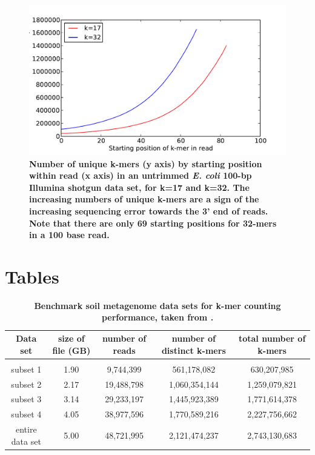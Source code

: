 \documentclass[10pt]{article}
\begin{document}
\begin{figure}[!ht]
\centerline{\includegraphics[width=5in]{./figure/perc_unique_pos}}
\caption{\bf Number of unique k-mers (y axis) by starting position
  within read (x axis) in an untrimmed {\em E. coli} 100-bp Illumina
  shotgun data set, for k=17 and k=32.  The increasing numbers of
  unique k-mers are a sign of the increasing sequencing error towards
  the 3' end of reads.  Note that there are only 69 starting positions
  for 32-mers in a 100 base read.}
\label{fig:perc_unique_pos}
\end{figure}

\clearpage
\section*{Tables}

\begin{table}[!ht]
\caption{
\bf{Benchmark soil metagenome data sets for k-mer counting performance, taken from
\cite{Howe2012}.}}
\begin{tabular}{ |c | c |c| c|c| }
Data set & size of file (GB) & number of reads & number of distinct
k-mers & total number of k-mers \\
\hline \\
subset 1        & 1.90 &  9,744,399 &   561,178,082 &   630,207,985 \\
subset 2        & 2.17 & 19,488,798 & 1,060,354,144 & 1,259,079,821 \\
subset 3        & 3.14 & 29,233,197 & 1,445,923,389 & 1,771,614,378 \\
subset 4        & 4.05 & 38,977,596 & 1,770,589,216 & 2,227,756,662 \\
entire data set & 5.00 & 48,721,995 & 2,121,474,237 & 2,743,130,683 \\
\end{tabular}
\begin{flushleft}
\end{flushleft}
\label{table:datasets}
\end{table}
\end{document}
